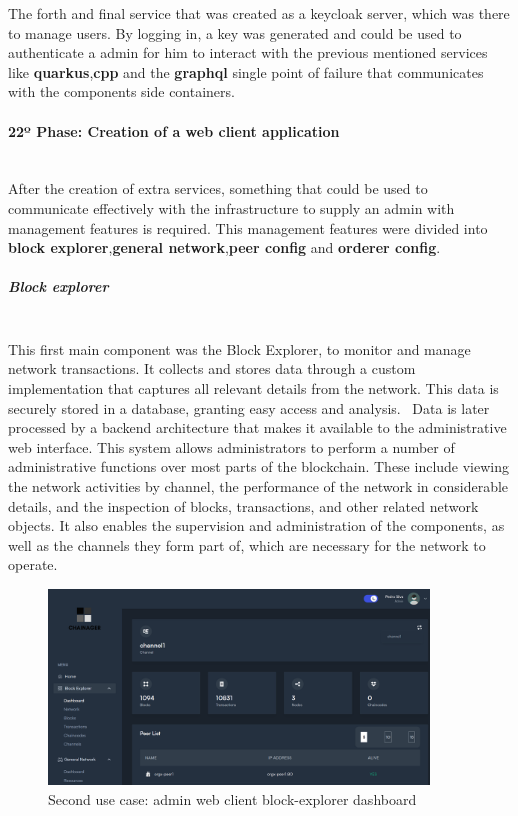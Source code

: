 The forth and final service that was created as a keycloak server, which was there to manage users. By logging in, a key was generated and could be used to authenticate a admin for him to interact with the previous mentioned services like \textbf{quarkus},\textbf{cpp} and the \textbf{graphql} single point of failure that communicates with the components side containers.

\paragraph{22º Phase: Creation of a web client application}\mbox{}\\
After the creation of extra services, something that could be used to communicate effectively with the infrastructure to supply an admin with management features is required. This management features were divided into \textbf{block explorer},\textbf{general network},\textbf{peer config} and \textbf{orderer config}.

\subparagraph{Block explorer}\mbox{}\\
This first main component was the Block Explorer, to monitor and manage network transactions. It collects and stores data through a custom implementation that captures all relevant details from the network. This data is securely stored in a database, granting easy access and analysis. 
Data is later processed by a backend architecture that makes it available to the administrative web interface.
This system allows administrators to perform a number of administrative functions over most parts of the blockchain. These include viewing the network activities by channel, the performance of the network in considerable details, and the inspection of blocks, transactions, and other related network objects. It also enables the supervision and administration of the components, as well as the channels they form part of, which are necessary for the network to operate.

\begin{figure}[H]
    \centering
    \includegraphics[width=0.9\textwidth]{assets/use-case-2/block-explorer-dashboard.png} %
    \caption{Second use case: admin web client block-explorer dashboard}
    \label{fig:sample-image} 
\end{figure}

